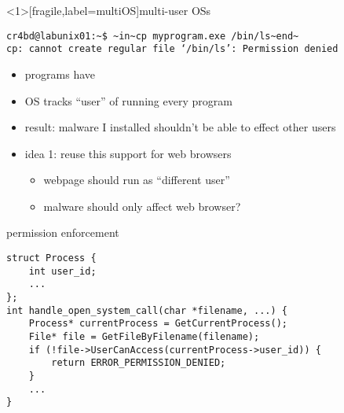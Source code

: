 
\begin{frame}<1>[fragile,label=multiOS]{multi-user OSs}
\begin{lstlisting}
cr4bd@labunix01:~$ ~in~cp myprogram.exe /bin/ls~end~
cp: cannot create regular file ‘/bin/ls’: Permission denied
\end{lstlisting}
    \begin{itemize}
        \item programs have 
        \item<2-> OS tracks ``user'' of running every program
        \item<2-> result: malware I installed shouldn't be able to effect other users
        \item<2-> idea 1: reuse this support for web browsers
            \begin{itemize}
            \item webpage should run as ``different user''
            \item malware should only affect web browser?
            \end{itemize}
    \end{itemize}
\end{frame}

\begin{frame}[fragile,label=permEnforce]{permission enforcement}
    \begin{verbatim}
struct Process {
    int user_id;
    ...
};
int handle_open_system_call(char *filename, ...) {
    Process* currentProcess = GetCurrentProcess();
    File* file = GetFileByFilename(filename);
    if (!file->UserCanAccess(currentProcess->user_id)) {
        return ERROR_PERMISSION_DENIED;
    }
    ...
}
\end{verbatim}
\end{frame}


